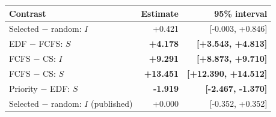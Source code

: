 \begin{tabular*}{\columnwidth}{@{\extracolsep{\fill}}lrr@{}}\toprule
Contrast & Estimate & 95\% interval \\ \midrule
Selected $-$ random: $I$ & +0.421 & [-0.003, +0.846] \\
EDF $-$ FCFS: $S$ & \textbf{+4.178} & \textbf{[+3.543, +4.813]} \\
FCFS $-$ CS: $I$ & \textbf{+9.291} & \textbf{[+8.873, +9.710]} \\
FCFS $-$ CS: $S$ & \textbf{+13.451} & \textbf{[+12.390, +14.512]} \\
Priority $-$ EDF: $S$ & \textbf{-1.919} & \textbf{[-2.467, -1.370]} \\
Selected $-$ random: $I$ (published) & +0.000 & [-0.352, +0.352] \\
\bottomrule\end{tabular*}
